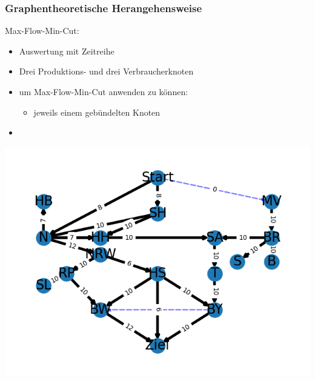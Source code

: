\documentclass[aspectratio=169,t]{beamer}
\begin{document}
	\begin{frame}
		\frametitle{Graphentheoretische Herangehensweise}
		\vspace*{2mm}
		\begin{minipage}{1\linewidth}
			\begin{minipage}{.4\linewidth}
				\vspace*{-12mm}
				Max-Flow-Min-Cut:
				\begin{itemize}
					
					\item Auswertung mit Zeitreihe
						\vspace*{2mm}
					
					\item Drei Produktions- und drei Verbraucherknoten
						\vspace*{2mm}
						
					\item um Max-Flow-Min-Cut anwenden zu können:
						\vspace*{2mm}
						\begin{itemize}
							\item jeweils einem gebündelten Knoten
						\end{itemize}
					
					
						\vspace*{2mm}
					
					\item 
					
					
				\end{itemize}
		
			\end{minipage}
			\hfill
			\begin{minipage}{.6\linewidth}
				\centering
				\includegraphics[width=.9\linewidth]{Figure_4.png}
				
			\end{minipage}
		\end{minipage}	
		
		
		
	\end{frame}
	
\end{document}

